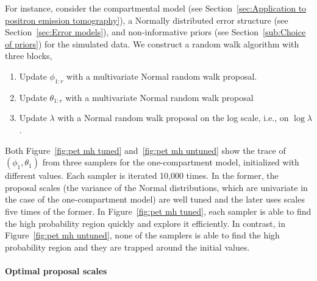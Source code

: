 For instance, consider the \pet compartmental model (see Section~\ref{sec:Application to positron emission tomography}), a Normally distributed error structure (see Section~\ref{sec:Error models}), and non-informative priors (see Section~\ref{sub:Choice of priors}) for the simulated data. We construct a random walk algorithm with three blocks,
\begin{enumerate}
  \item Update $\phi_{1:r}$ with a multivariate Normal random walk proposal.
  \item Update $\theta_{1:r}$ with a multivariate Normal random walk proposal
  \item Update $\lambda$ with a Normal random walk proposal on the log scale,
    i.e., on $\log\lambda$.
\end{enumerate}
Both Figure~\ref{fig:pet mh tuned} and~\ref{fig:pet mh untuned} show the trace of $(\phi_1, \theta_1)$ from three samplers for the one-compartment model, initialized with different values. Each sampler is iterated 10,000 times. In the former, the proposal scales (the variance of the Normal distributions, which are univariate in the case of the one-compartment model) are well tuned and the later uses scales five times of the former. In Figure~\ref{fig:pet mh tuned}, each sampler is able to find the high probability region quickly and explore it efficiently. In contrast, in Figure~\ref{fig:pet mh untuned}, none of the samplers is able to find the high probability region and they are trapped around the initial values.




\paragraph{Optimal proposal scales}

